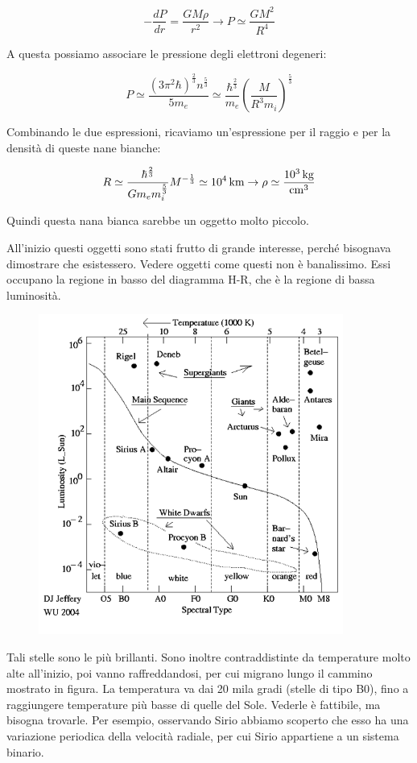 $$-\frac{dP}{dr}=\frac{GM\rho}{r^{2}} \rightarrow P \simeq \frac{GM^{2}}{R^{4}}$$

A questa possiamo associare le pressione degli elettroni degeneri:

$$P\simeq \frac{(3\pi^{2}\hbar)^{\frac{2}{3}}n^{\frac{5}{3}}}{5m_e} \simeq \frac{\hbar^{\frac{2}{3}}}{m_e} \left( \frac{M}{R^{3}m_i} \right)^{\frac{5}{3}}$$

Combinando le due espressioni, ricaviamo un'espressione per il raggio e per la densità di queste nane bianche:

$$R \simeq \frac{\hbar^{\frac{2}{3}}}{Gm_{e}m_{i}^{\frac{5}{3}}} M^{-\frac{1}{3}} \simeq 10^{4} \, \text{km} \rightarrow \rho \simeq \rm \frac{10^3 \, kg}{cm^{3}}$$

Quindi questa nana bianca sarebbe un oggetto molto piccolo.

All'inizio questi oggetti sono stati frutto di grande interesse, perché bisognava dimostrare che esistessero. Vedere oggetti come questi non è banalissimo. Essi occupano la regione in basso del diagramma H-R, che è la regione di bassa luminosità.

\begin{figure}[H]
    \centering
    \includegraphics[width=10cm]{lezione 28 novembre/nanebianche.png}
\end{figure}

Tali stelle sono le più brillanti. Sono inoltre contraddistinte da temperature molto alte all'inizio, poi vanno raffreddandosi, per cui migrano lungo il cammino mostrato in figura. La temperatura va dai 20 mila gradi (stelle di tipo B0), fino a raggiungere temperature più basse di quelle del Sole. Vederle è fattibile, ma bisogna trovarle. Per esempio, osservando Sirio abbiamo scoperto che esso ha una variazione periodica della velocità radiale, per cui Sirio appartiene a un sistema binario.

